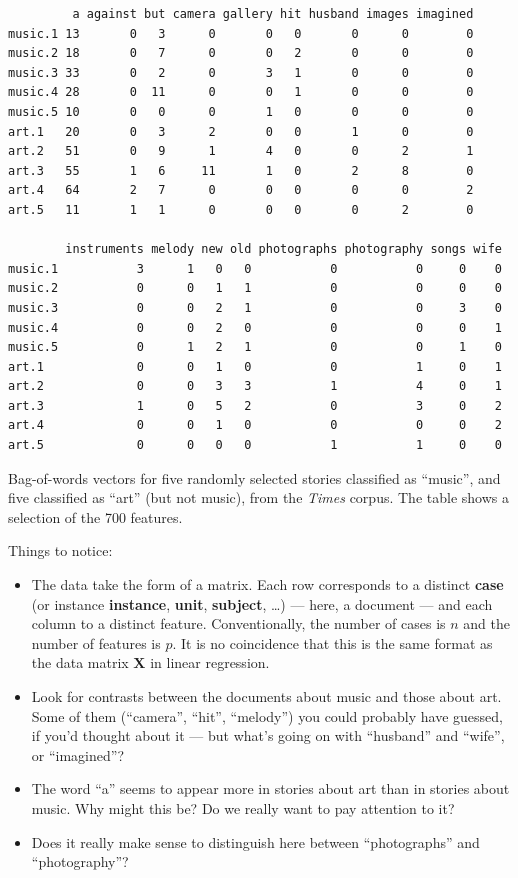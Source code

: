 \documentclass{article}
\begin{document}
\begin{table}
\begin{verbatim}
         a against but camera gallery hit husband images imagined
music.1 13       0   3      0       0   0       0      0        0
music.2 18       0   7      0       0   2       0      0        0
music.3 33       0   2      0       3   1       0      0        0
music.4 28       0  11      0       0   1       0      0        0
music.5 10       0   0      0       1   0       0      0        0
art.1   20       0   3      2       0   0       1      0        0
art.2   51       0   9      1       4   0       0      2        1
art.3   55       1   6     11       1   0       2      8        0
art.4   64       2   7      0       0   0       0      0        2
art.5   11       1   1      0       0   0       0      2        0

        instruments melody new old photographs photography songs wife
music.1           3      1   0   0           0           0     0    0
music.2           0      0   1   1           0           0     0    0
music.3           0      0   2   1           0           0     3    0
music.4           0      0   2   0           0           0     0    1
music.5           0      1   2   1           0           0     1    0
art.1             0      0   1   0           0           1     0    1
art.2             0      0   3   3           1           4     0    1
art.3             1      0   5   2           0           3     0    2
art.4             0      0   1   0           0           0     0    2
art.5             0      0   0   0           1           1     0    0
\end{verbatim}
  \caption{Bag-of-words vectors for five randomly selected stories classified as ``music'', and five classified as ``art'' (but not music), from the {\em Times} corpus.  The table shows a selection of the 700 features.}
\label{table:bow-matrix}
\end{table}

Things to notice:
\begin{itemize}
\item The data take the form of a matrix.  Each row corresponds to a distinct
  {\bf case} (or instance {\bf instance}, {\bf unit}, {\bf subject}, \ldots)
  --- here, a document --- and each column to a distinct feature.
  Conventionally, the number of cases is $n$ and the number of features is $p$.
  It is no coincidence that this is the same format as the data matrix
  $\mathbf{X}$ in linear regression.
\item Look for contrasts between the documents about music and those about art.
  Some of them (``camera'', ``hit'', ``melody'') you could probably have
  guessed, if you'd thought about it --- but what's going on with ``husband''
  and ``wife'', or ``imagined''?
\item The word ``a'' seems to appear more in stories about art than in stories
  about music.  Why might this be?  Do we really want to pay attention to it?
\item Does it really make sense to distinguish here between ``photographs'' and
  ``photography''?
\end{itemize}
\end{document}
